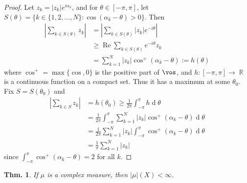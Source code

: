 \documentclass[12pt, a4paper]{book}
\DeclareMathOperator{\R}{\mathbb{R}}
\DeclareMathOperator{\re}{Re}
\renewcommand{\d}[1]{\ensuremath{\operatorname{d}\!{#1}}} %
\newtheorem{theorem}{Thm.}[section]
\theoremstyle{nonumberplain}
\newtheorem{proof}{Proof}
\begin{document}
\begin{proof}
    Let $z_k=|z_k|e^{i\alpha_k}$, and for $\theta\in[-\pi,\pi]$, let $S(\theta)=\{k\in\{1,2,\ldots,N\}:\cos(\alpha_k-\theta)>0\}$.
    Then
    \begin{align*}
        \left\lvert\sum\limits_{k\in S(\theta)}z_k\right\rvert&=\left\lvert\sum\limits_{k\in S(\theta)}|z_k|e^{-i\theta}\right\rvert\\
                                                              &\geq \re\sum\limits_{k\in S(\theta)}e^{-i\theta}z_k\\
                                                              &= \sum\limits_{k=1}^N|z_k|\cos^+(\alpha_k-\theta):=h(\theta)
    \end{align*}
    where $\cos^+=\max\{\cos,0\}$ is the positive part of $\vos$, and $h:[-\pi,\pi]\to\R$ is a continuous function on a compact set.
    Thus it has a maximum at some $\theta_0$.
    Fix $S=S(\theta_0)$ and
    \begin{align*}
        \left\lvert\sum\limits_{k\in S}z_k\right\rvert &= h(\theta_0)\geq \frac{1}{2\pi}\int_{-\pi}^\pi h\d{\theta}\\
                                                       &=\frac{1}{2\pi}\int_{-\pi}^\pi \sum\limits_{k=1}^N|z_k|\cos^+(\alpha_k-\theta)\d{\theta}\\
                                                       &= \frac{1}{2\pi}\sum\limits_{k=1}^N|z_k|\int_{-\pi}^\pi\cos^+(\alpha_k-\theta)\d{\theta}\\
                                                       &=\frac{1}{\pi}\sum\limits_{k=1}^N|z_k|
    \end{align*}
    since $\int_{-\pi}^\pi\cos^+(\alpha_k-\theta)=2$ for all $k$.
\end{proof}
\begin{theorem}
    If $\mu$ is a complex measure, then $|\mu|(X)<\infty$.
\end{theorem}
\end{document}
